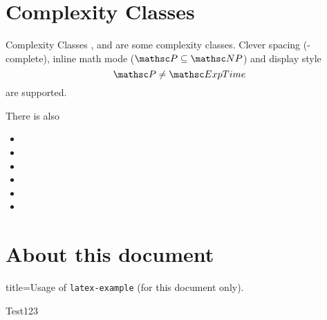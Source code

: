\documentclass{article}
\begin{document}
\tableofcontents
\newpage

\section{Complexity Classes}
\begin{latex-example}[lefthand width=5cm]{Complexity Classes}
\PTime, \NP and  are some complexity classes.
Clever spacing (\NP-complete),
inline math mode ($\PTime \subseteq \NP$)
and display style
\[
	\PTime \neq \ExpTime
\]
are supported.

There is also
\begin{itemize}
	\item \kExpTime
	\item \NkExpTime 
	\item \kExpTime[4]
	\item \NkExpTime[4]
	\item \kExpSpace
	\item \kExpSpace[5]
\end{itemize}
\end{latex-example}

\appendix

\section{About this document}
\begin{tcblisting}{title=Usage of \texttt{latex-example} (for this document only).}
	\begin{latex-example}[lefthand width=3.5cm]{Test123}
	\end{latex-example}
\end{tcblisting}
\end{document}
